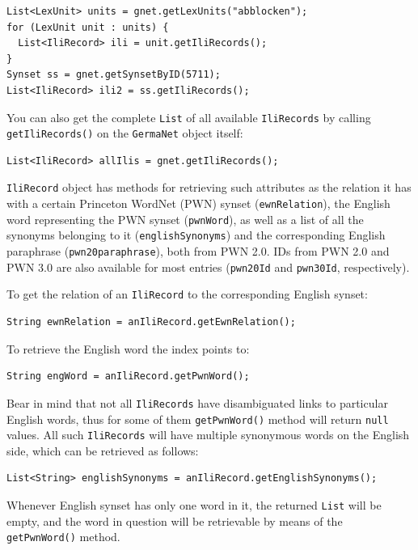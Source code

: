 \documentclass[12pt,a4paper,english,utf8]{report}
\begin{document}
\begin{lstlisting}
List<LexUnit> units = gnet.getLexUnits("abblocken");
for (LexUnit unit : units) {
  List<IliRecord> ili = unit.getIliRecords();
}
Synset ss = gnet.getSynsetByID(5711);
List<IliRecord> ili2 = ss.getIliRecords();
\end{lstlisting}

You can also get the complete \texttt{List} of all available \texttt{IliRecords} by calling \texttt{getIliRecords()} on the \texttt{GermaNet} object itself:

\begin{lstlisting}
List<IliRecord> allIlis = gnet.getIliRecords();
\end{lstlisting}

\texttt{IliRecord} object has methods for retrieving such attributes as the relation it has with a certain Princeton WordNet (PWN) synset (\texttt{ewnRelation}), the English word representing the PWN synset (\texttt{pwnWord}), as well as a list of all the synonyms belonging to it (\texttt{englishSynonyms}) and the corresponding English paraphrase (\texttt{pwn20paraphrase}), both from PWN 2.0. IDs from PWN 2.0 and PWN 3.0 are also available for most entries (\texttt{pwn20Id} and \texttt{pwn30Id}, respectively).

To get the relation of an \texttt{IliRecord} to the corresponding English synset:

\begin{lstlisting}
String ewnRelation = anIliRecord.getEwnRelation();
\end{lstlisting}

To retrieve the English word the index points to:

\begin{lstlisting}
String engWord = anIliRecord.getPwnWord();
\end{lstlisting}

Bear in mind that not all \texttt{IliRecords} have disambiguated links to particular English words, thus for some of them \texttt{getPwnWord()} method will return \texttt{null} values. All such \texttt{IliRecords} will have multiple synonymous words on the English side, which can be retrieved as follows:

\begin{lstlisting}
List<String> englishSynonyms = anIliRecord.getEnglishSynonyms();
\end{lstlisting}

Whenever English synset has only one word in it, the returned \texttt{List} will be empty, and the word in question will be retrievable by means of the \texttt{getPwnWord()} method.
\end{document}
